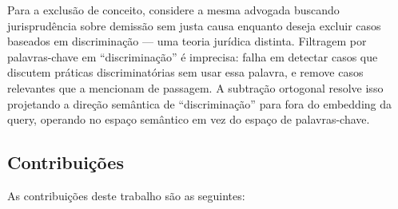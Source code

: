 \documentclass{article}
\begin{document}
Para a exclusão de conceito, considere a mesma advogada buscando jurisprudência sobre demissão sem justa causa enquanto deseja excluir casos baseados em discriminação --- uma teoria jurídica distinta. Filtragem por palavras-chave em ``discriminação'' é imprecisa: falha em detectar casos que discutem práticas discriminatórias sem usar essa palavra, e remove casos relevantes que a mencionam de passagem. A subtração ortogonal resolve isso projetando a direção semântica de ``discriminação'' para fora do embedding da query, operando no espaço semântico em vez do espaço de palavras-chave.

\subsection{Contribuições}

As contribuições deste trabalho são as seguintes:
\end{document}
